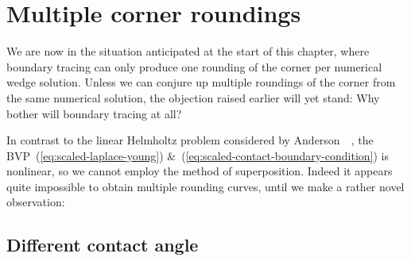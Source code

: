 \section{Multiple corner roundings}
\label{sec:moderate.multiple}

We are now in the situation anticipated at the start of this chapter,
where boundary tracing can only produce one rounding of the corner
per numerical wedge solution.
Unless we can conjure up multiple roundings of the corner
from the same numerical solution,
the objection raised earlier will yet stand:
Why bother will boundary tracing at all?

In contrast to the linear Helmholtz problem considered by
Anderson~\etal~\cite{anderson-2007-boundary-tracing-ii-applications},
the BVP~(\ref{eq:scaled-laplace-young})
\&~(\ref{eq:scaled-contact-boundary-condition})
is nonlinear,
so we cannot employ the method of superposition.
Indeed it appears quite impossible
to obtain multiple rounding curves,
until we make a rather novel observation:

\subsection{Different contact angle}
\label{sec:moderate.multiple.different}

